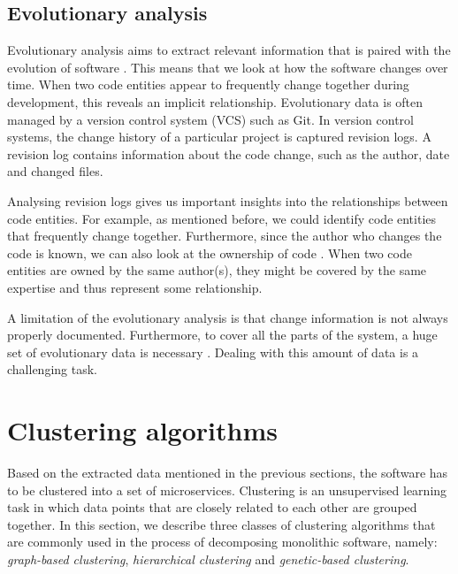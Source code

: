 \subsection{Evolutionary analysis}
Evolutionary analysis aims to extract relevant information that is paired with the evolution of software \cite{beck2011congruence}. This means that we look at how the software changes over time. When two code entities appear to frequently change together during development, this reveals an implicit relationship. Evolutionary data is often managed by a version control system (VCS) such as Git. In version control systems, the change history of a particular project is captured revision logs. A revision log contains information about the code change, such as the author, date and changed files. \par 
Analysing revision logs gives us important insights into the relationships between code entities. For example, as mentioned before, we could identify code entities that frequently change together. Furthermore, since the author who changes the code is known, we can also look at the ownership of code \cite{beck2011congruence}. When two code entities are owned by the same author(s), they might be covered by the same expertise and thus represent some relationship. \par
A limitation of the evolutionary analysis is that change information is not always properly documented. Furthermore, to cover all the parts of the system, a huge set of evolutionary data is necessary \cite{alsarhan2020software}. Dealing with this amount of data is a challenging task. 

\section{Clustering algorithms}\label{s:clustering_algorithms}
Based on the extracted data mentioned in the previous sections, the software has to be clustered into a set of microservices. Clustering is an unsupervised learning task in which data points that are closely related to each other are grouped together. In this section, we describe three classes of clustering algorithms that are commonly used in the process of decomposing monolithic software, namely: \textit{graph-based clustering}, \textit{hierarchical clustering} and \textit{genetic-based clustering}.

